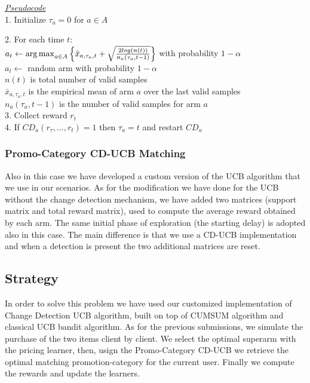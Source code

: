 \underline{\textit{Pseudocode}}\\

1. Initialize $\tau_{a} = 0$ for $a\in A$ 

2. For each time $t$:\\

\hspace{0.8cm} $a_{t} \leftarrow \operatorname{arg\,max}_{a \in A}{\left\{\bar{x}_{a,\tau_{a},t} + \sqrt{\frac{2 log(n(t))}{{n_{a}(\tau_{a},t-1)}} }\right\}}$ with probability $1-\alpha$\\

\hspace{0.8cm} $a_{t} \leftarrow$ random arm with probability $1-\alpha$ \\

$n(t)$	is total number of valid samples\\

$\bar{x}_{a,\tau_{a},t}$ is the empirical mean of arm $a$ over the last valid samples\\

$n_{a}(\tau_{a},t-1)$ is the number of valid samples for arm $a$\\

3. Collect reward $r_t$\\

4. If $CD_a (r_{\tau},...,r_t) = 1$ then $\tau_a = t$ and restart $CD_a$

\subsubsection*{Promo-Category CD-UCB Matching} Also in this case we have developed a custom version of the UCB algorithm that we use in our scenarios. As for the modification we have done for the UCB without the change detection mechanism, we have added two matrices (support matrix and total reward matrix), used to compute the average reward obtained by each arm. The same initial phase of exploration (the starting delay) is adopted also in this case. The main difference is that we use a CD-UCB implementation and when a detection is present the two additional matrices are reset. 

\subsection*{Strategy}
In order to solve this problem we have used our customized implementation of Change Detection UCB algorithm, built on top of CUMSUM algorithm and classical UCB bandit algorithm. As for the previous submissions, we simulate the purchase of the two items client by client. We select the optimal superarm with the pricing learner, then, usign the Promo-Category CD-UCB we retrieve the optimal matching promotion-category for the current user. Finally we compute the rewards and update the learners. 


